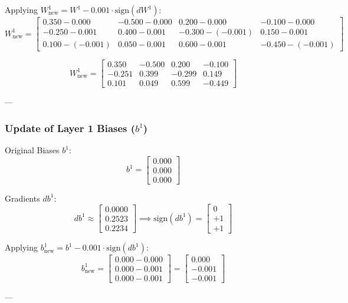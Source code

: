 \documentclass[11pt]{article}
\begin{document}
Applying $W^1_{\text{new}} = W^1 - 0.001 \cdot \text{sign}(dW^1)$:
\[
W^1_{\text{new}} =
\begin{bmatrix}
0.350 - 0.000 & -0.500 - 0.000 & 0.200 - 0.000 & -0.100 - 0.000 \\
-0.250 - 0.001 & 0.400 - 0.001 & -0.300 - (-0.001) & 0.150 - 0.001 \\
0.100 - (-0.001) & 0.050 - 0.001 & 0.600 - 0.001 & -0.450 - (-0.001)
\end{bmatrix}
\]

\[
W^1_{\text{new}} =
\begin{bmatrix}
0.350 & -0.500 & 0.200 & -0.100 \\
-0.251 & 0.399 & -0.299 & 0.149 \\
0.101 & 0.049 & 0.599 & -0.449
\end{bmatrix}
\]

---
\subsubsection{Update of Layer 1 Biases (\texorpdfstring{$b^1$}{b1})}

Original Biases $b^1$:
\[
b^1 = \begin{bmatrix} 0.000 \\ 0.000 \\ 0.000 \end{bmatrix}
\]

Gradients $db^1$:
\[
db^1 \approx \begin{bmatrix} 0.0000 \\ 0.2523 \\ 0.2234 \end{bmatrix} \implies \text{sign}(db^1) = \begin{bmatrix} 0 \\ +1 \\ +1 \end{bmatrix}
\]

Applying $b^1_{\text{new}} = b^1 - 0.001 \cdot \text{sign}(db^1)$:
\[
b^1_{\text{new}} =
\begin{bmatrix}
0.000 - 0.000 \\
0.000 - 0.001 \\
0.000 - 0.001
\end{bmatrix}
=
\begin{bmatrix}
0.000 \\
-0.001 \\
-0.001
\end{bmatrix}
\]

---
\end{document}
